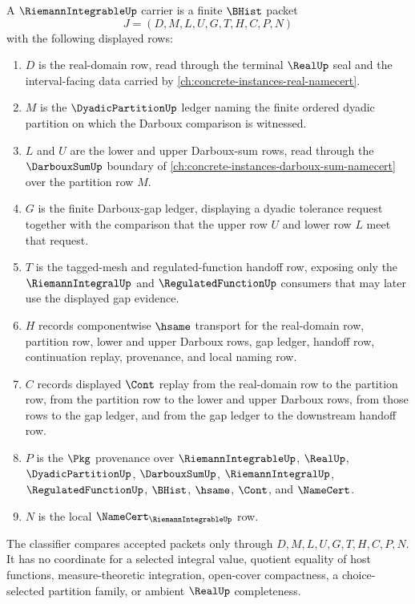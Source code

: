 \begin{definition}
\label{def:riemann-integrable-carrier}
A $\RiemannIntegrableUp$ carrier is a finite $\BHist$ packet
$$
J=(D,M,L,U,G,T,H,C,P,N)
$$
with the following displayed rows:
\begin{enumerate}
\item $D$ is the real-domain row, read through the terminal $\RealUp$ seal and the interval-facing data carried by \autoref{ch:concrete-instances-real-namecert}.
\item $M$ is the $\DyadicPartitionUp$ ledger naming the finite ordered dyadic partition on which the Darboux comparison is witnessed.
\item $L$ and $U$ are the lower and upper Darboux-sum rows, read through the $\DarbouxSumUp$ boundary of \autoref{ch:concrete-instances-darboux-sum-namecert} over the partition row $M$.
\item $G$ is the finite Darboux-gap ledger, displaying a dyadic tolerance request together with the comparison that the upper row $U$ and lower row $L$ meet that request.
\item $T$ is the tagged-mesh and regulated-function handoff row, exposing only the $\RiemannIntegralUp$ and $\RegulatedFunctionUp$ consumers that may later use the displayed gap evidence.
\item $H$ records componentwise $\hsame$ transport for the real-domain row, partition row, lower and upper Darboux rows, gap ledger, handoff row, continuation replay, provenance, and local naming row.
\item $C$ records displayed $\Cont$ replay from the real-domain row to the partition row, from the partition row to the lower and upper Darboux rows, from those rows to the gap ledger, and from the gap ledger to the downstream handoff row.
\item $P$ is the $\Pkg$ provenance over $\RiemannIntegrableUp$, $\RealUp$, $\DyadicPartitionUp$, $\DarbouxSumUp$, $\RiemannIntegralUp$, $\RegulatedFunctionUp$, $\BHist$, $\hsame$, $\Cont$, and $\NameCert$.
\item $N$ is the local $\NameCert_{\RiemannIntegrableUp}$ row.
\end{enumerate}
The classifier compares accepted packets only through $D,M,L,U,G,T,H,C,P,N$. It has no coordinate for a selected integral value, quotient equality of host functions, measure-theoretic integration, open-cover compactness, a choice-selected partition family, or ambient $\RealUp$ completeness.
\end{definition}

